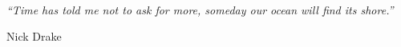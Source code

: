 \begin{epigrafe}
	\vspace*{\fill}
	\noindent
	\hangindent=5cm \\
 	\textit{``Time has told me not to ask for more,
  someday our ocean will find its shore.''}
 	\begin{flushright}
	Nick Drake
	\end{flushright}
\end{epigrafe}
